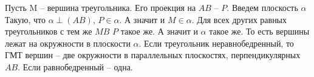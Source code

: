 Пусть M -- вершина треугольника. Его проекция на $AB$ -- $P$. Введем плоскость $\alpha$ Такую, что $\alpha\perp(AB)$, $P\in\alpha$. А значит и $M\in\alpha$. Для всех других равных треугольников с тем же $MB$ $P$ такое же. А значит и $\alpha$ такое же. То есть вершины лежат на окружности в плоскости $\alpha$. Если треугольник неравнобедренный, то ГМТ вершин -- две окружности в параллельных плоскостях, перпендикулярных $AB$. Если равнобедренный -- одна.